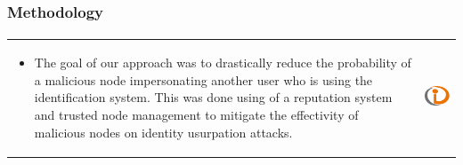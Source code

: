 \begin{frame}
\frametitle{Methodology}
\framesubtitle{}
\begin{table}
\begin{tabular}{p{7cm}p{3cm}}
\begin{itemize}
  \item The goal of our approach was to drastically reduce the probability of a
malicious node impersonating another user who is using the identification
system. This was done using of a reputation system and trusted node management
to mitigate the effectivity of malicious nodes on identity usurpation attacks.

\end{itemize}
&
\vspace{1.5cm}
\includegraphics[width=4cm]{img/example}\\
\end{tabular}
\end{table}
\end{frame}
